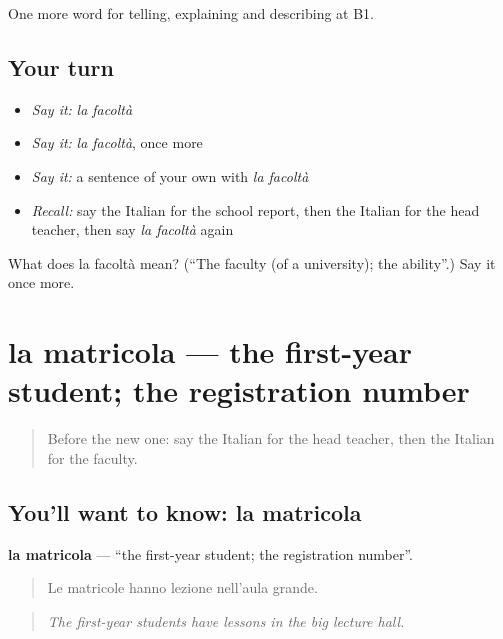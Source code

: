 \begin{grammarlens}[title={What you've built}]
One more word for telling, explaining and describing at B1.
\end{grammarlens}

\subsection*{Your turn}
\begin{itemize}
\raggedright
  \item \emph{Say it:} \emph{la facoltà}
  \item \emph{Say it:} \emph{la facoltà}, once more
  \item \emph{Say it:} a sentence of your own with \emph{la facoltà}
  \item \emph{Recall:} say the Italian for the school report, then the Italian for the head teacher, then say \emph{la facoltà} again
\end{itemize}

\begin{tcolorbox}[breakable,colback=teal!4,colframe=teal!35!black,title={Before you move on}]
What does la facoltà mean? (\textquotedblleft{}The faculty (of a university); the ability\textquotedblright{}.) Say it once more.
\end{tcolorbox}
\section[la matricola]{la matricola — the first-year student; the registration number}

\label{lesson:IT-C380-matricola}



\begin{quote}
Before the new one: say the Italian for the head teacher, then the Italian for the faculty.
\end{quote}

\subsection*{You'll want to know: la matricola}
\textbf{la matricola} — \textquotedblleft{}the first-year student; the registration number\textquotedblright{}.

\begin{quote}
Le matricole hanno lezione nell'aula grande.
\end{quote}

\begin{quote}
\emph{The first-year students have lessons in the big lecture hall.}
\end{quote}

